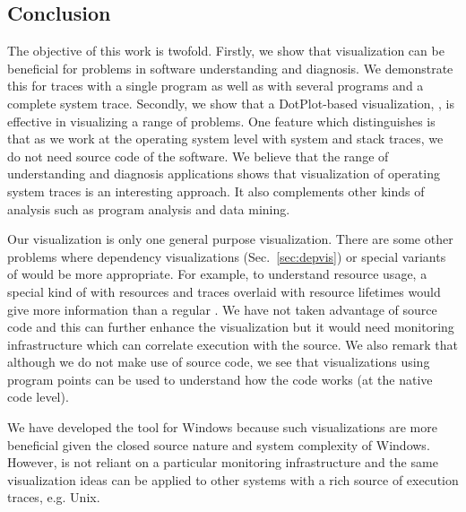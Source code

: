 \subsection{Conclusion}
\label{sec:conclusion}

The objective of this work is twofold.
Firstly, we show that visualization can be beneficial for problems
in software understanding and diagnosis. We demonstrate this
for traces with a single program as well as with
several programs and a complete system trace.
Secondly, we show that a DotPlot-based visualization, \VDP{}, is effective
in visualizing a range of problems.
One feature which distinguishes \lviz{} is that as we work
at the operating system level with system and stack traces, 
we do not need source code of the software.
We believe that the range of understanding and diagnosis applications
shows that visualization of operating system traces is an interesting approach.
It also complements other kinds of analysis such
as program analysis and data mining.

Our \VDP{} visualization is only one general purpose visualization.
There are some other problems where dependency visualizations
(Sec.~\ref{sec:depvis}) or special
variants of \VDP{} would be more appropriate. For example, to understand
resource usage, a special kind of \VDP{} with resources and traces overlaid
with resource lifetimes would give more information than a regular \VDP{}.
We have not taken advantage of source code and this can further enhance
the visualization but it would need monitoring infrastructure which
can correlate execution with the source.
We also remark that although we do not make use of source code, we
see that visualizations using program points can be used to understand 
how the code works (at the native code level).

We have developed the \VDP{} tool for Windows because such visualizations
are more beneficial given the closed source nature and system complexity
of Windows. 
However, \VDP{} is not reliant on a particular monitoring 
infrastructure and the same visualization ideas can be applied
to other systems with a rich source of execution traces, e.g. Unix.
